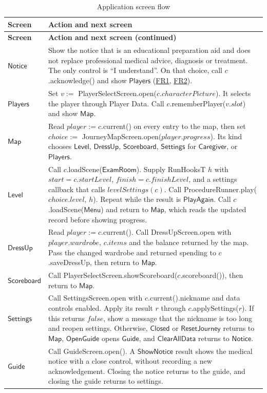 \documentclass[10pt, titlepage]{article}
\newcommand{\srsurl}{https://team-hindsight.github.io/ophthamology-game/SRS/SRS.pdf}
\newcommand{\srsitemref}[2]{\href{\srsurl\#nameddest=#1}{#2}}
\newcommand{\T}[1]{\mathit{#1}}          %
\newcommand{\V}[1]{\mathsf{#1}}          %
\newcommand{\false}{\mathit{false}}
\begin{document}
\begingroup
\small
\renewcommand{\arraystretch}{1.2}
\begin{longtable}{@{}p{}>{\raggedright\arraybackslash}p{}@{}}
\caption{Application screen flow}\label{TblApplicationFlow}\\
\toprule
\textbf{Screen} & \textbf{Action and next screen}\\
\midrule
\endfirsthead
\toprule
\textbf{Screen} & \textbf{Action and next screen (continued)}\\
\midrule
\endhead
\bottomrule
\endfoot
$\V{Notice}$ & Show the notice that \progname{} is an educational
preparation aid and does not replace professional medical advice,
diagnosis or treatment. The only control is ``I understand''. On that
choice, call $c$.acknowledge() and show $\V{Players}$
(\srsitemref{FR_MedicalNotice}{FR1},
\srsitemref{FR_RecordAck}{FR2}).\\[0.4em]
$\V{Players}$ & Set $v :=$
PlayerSelectScreen.open($c.\T{characterPicture}$). It selects the player
through Player Data. Call $c$.rememberPlayer($v.\T{slot}$) and show
$\V{Map}$.\\[0.4em]
$\V{Map}$ & Read $\T{player} := c$.current() on every entry to the map,
then set $\T{choice} :=$
JourneyMapScreen.open($\T{player}.\T{progress}$). Its kind chooses
$\V{Level}$, $\V{DressUp}$, $\V{Scoreboard}$, $\V{Settings}$
for $\V{Caregiver}$, or $\V{Players}$.\\[0.4em]
$\V{Level}$ & Call $c$.loadScene($\V{ExamRoom}$). Supply RunHooksT $h$
with $\T{start} = c.\T{startLevel}$, $\T{finish} = c.\T{finishLevel}$,
and a settings callback that calls $\T{levelSettings}(c)$.
Call ProcedureRunner.play($\T{choice}.\T{level}$, $h$).
Repeat while the result is $\V{PlayAgain}$. Call
$c$.loadScene($\V{Menu}$) and return to $\V{Map}$, which reads the updated
record before showing progress.\\[0.4em]
$\V{DressUp}$ & Read $\T{player} := c$.current(). Call DressUpScreen.open
with $\T{player}.\T{wardrobe}$, $c.\T{items}$ and the balance returned by
the map. Pass the changed wardrobe and returned spending to
$c$.saveDressUp, then return to $\V{Map}$.\\[0.4em]
$\V{Scoreboard}$ & Call
PlayerSelectScreen.showScoreboard($c$.scoreboard()), then return to
$\V{Map}$.\\[0.4em]
$\V{Settings}$ & Call SettingsScreen.open with $c$.current().nickname
and data controls enabled. Apply its result $r$ through
$c$.applySettings($r$). If this returns $\false$, show a message that the
nickname is too long and reopen settings. Otherwise, $\V{Closed}$ or $\V{ResetJourney}$
returns to $\V{Map}$, $\V{OpenGuide}$ opens $\V{Guide}$, and $\V{ClearAllData}$ returns
to $\V{Notice}$.\\[0.4em]
$\V{Guide}$ & Call GuideScreen.open(). A $\V{ShowNotice}$ result
shows the medical notice with a close control, without recording a new
acknowledgement. Closing the notice returns to the guide, and closing the
guide returns to settings.\\
\end{longtable}
\endgroup
\end{document}
